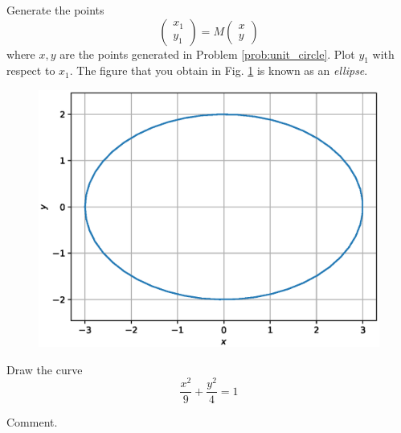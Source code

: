 \documentclass[journal,12pt,twocolumn]{IEEEtran}
\begin{document}
\begin{problem}
Generate the points 
\begin{equation}
\begin{pmatrix}
x_1
\\y_1
\end{pmatrix}
=
M \begin{pmatrix}
x
\\y
\end{pmatrix}
\end{equation}
where $x,y$ are the points generated in Problem \ref{prob:unit_circle}. Plot $y_1$ with respect to $x_1$.
The figure that you obtain in Fig. \ref{fig:ellipse_transform} is known as an {\em ellipse}.
\end{problem}
\solution

\begin{figure}[!h]
\centering
\includegraphics[width=\columnwidth]{./figs/ellipse_transform.eps}
\caption{}
\label{fig:ellipse_transform}
\end{figure}
%
\begin{problem}
Draw the curve
\begin{equation}
\label{eq:ellipse}
\frac{x^2}{9}+\frac{y^2}{4} = 1
\end{equation}
\end{problem}
Comment.
\end{document}
